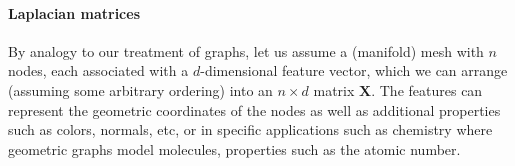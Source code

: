 %

 





\paragraph{Laplacian matrices}
%
By analogy to our treatment of graphs, let us assume a (manifold) mesh with $n$ nodes, each associated with a $d$-dimensional feature vector, which we can arrange (assuming some arbitrary ordering) into an $n\times d$ matrix $\mathbf{X}$. 
%
The features can represent the geometric coordinates of the nodes as well as additional properties such as colors, normals, etc, or in specific applications such as chemistry where geometric graphs model molecules, properties such as the atomic number. 


